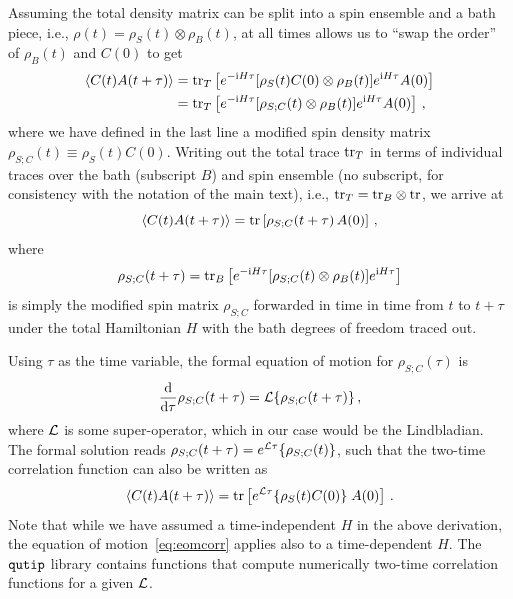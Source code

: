 \documentclass[aps,prd,10pt,twocolumn,superscriptaddress,floatfix,nofootinbib,amsmath,amssymb,altaffilletter,preprintnumbers]{revtex4-1}
\begin{document}
Assuming the total density matrix can be split into a spin ensemble and a bath piece, i.e., $\rho(t) = \rho_S(t) \otimes \rho_B(t)$, at all times allows us to ``swap the order'' of $\rho_B(t)$ and $C(0)$ to get
\begin{equation}
\begin{aligned}
\langle C(t) A(t+\tau) \rangle 
& = {\rm tr}_T\left[ e^{-{\rm i} H \tau} [\rho_S(t) C(0) \otimes \rho_B(t) ] e^{{\rm i} H\tau} A(0)\right] \\
& = {\rm tr}_T\left[ e^{-{\rm i} H \tau} [\rho_{S;C}(t) \otimes \rho_B(t) ] e^{{\rm i} H\tau} A(0)\right]\, ,
\end{aligned}
\end{equation}
where we have defined in the last line a modified spin density matrix $\rho_{S;C}(t) \equiv \rho_S(t) C(0)$.  Writing out the total trace ${\rm tr}_T$ in terms of individual traces over the bath (subscript $B$) and spin ensemble (no subscript, for consistency with the notation of the main text), i.e., ${\rm tr}_T =  {\rm tr}_B \otimes {\rm tr}$, we arrive at
\begin{equation}
\langle C(t) A(t+\tau) \rangle = {\rm tr} \left[ \rho_{S;C}(t+\tau)\, A(0)
\right]\, ,
\end{equation}
where 
\begin{equation}
\rho_{S;C}(t+\tau) = {\rm tr}_B \left[ e^{-{\rm i} H \tau} [\rho_{S;C}(t) \otimes \rho_B(t) ] e^{{\rm i} H\tau}\right]
\label{eq:modified}
\end{equation}
is simply the modified spin matrix $\rho_{S;C}$ forwarded in time in time from $t$ to $t + \tau$ under the total Hamiltonian $H$ with the bath degrees of freedom traced out. 

Using $\tau$ as the time variable, the formal equation of motion for $\rho_{S;C}(\tau)$ is
\begin{equation}
 \frac{{\rm d}}{{\rm d} \tau}  \rho_{S;C}(t+\tau) = {\cal L}\{\rho_{S;C} (t+\tau)  \} \, ,
 \label{eq:eomcorr}
\end{equation}
where ${\cal L}$ is some super-operator,  which in our case would be the Lindbladian. The formal solution reads
$\rho_{S;C}(t+\tau) = e^{{\cal L} \tau} \{ \rho_{S;C}(t)\}$,
such that the two-time correlation  function can also be written as
\begin{equation}
\langle C(t) A(t+\tau) \rangle = {\rm tr}\left[e^{{\cal L} \tau} \{\rho_{S}(t) C(0) \} \; A(0)
\right]\, .
\end{equation}
Note that while we have assumed a time-independent $H$ in the above derivation, the equation of motion~\eqref{eq:eomcorr} applies also to a time-dependent $H$. 
The ${\tt qutip}$ library contains functions that compute numerically two-time correlation functions for a given ${\cal L}$.
\end{document}
